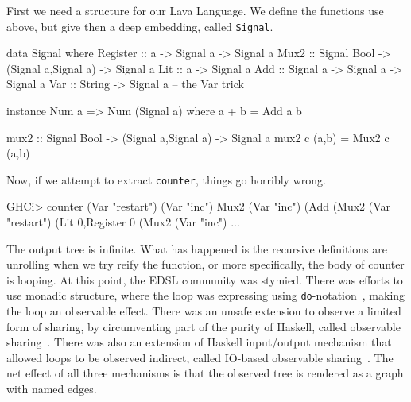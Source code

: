 \documentclass[11pt]{article}
\begin{document}
First we need a structure for our Lava Language. We define the
functions use above, but give then a deep embedding, called \verb|Signal|.
\begin{Code}
        
data Signal where
  Register :: a -> Signal a                      -> Signal a
  Mux2     :: Signal Bool -> (Signal a,Signal a) -> Signal a
  Lit      :: a                                  -> Signal a
  Add      :: Signal a -> Signal a               -> Signal a
  Var      :: String                             -> Signal  a -- the Var trick

instance Num a => Num (Signal a) where
  a + b = Add a b

mux2 :: Signal Bool -> (Signal a,Signal a) -> Signal a
mux2 c (a,b) = Mux2 c (a,b)

\end{Code}
Now, if we attempt to extract \verb|counter|, things go horribly wrong.
\begin{Code}
GHCi> counter (Var "restart") (Var "inc")
Mux2 (Var "inc") (Add (Mux2 (Var "restart") (Lit 0,Register 0 (Mux2 (Var "inc") ...
\end{Code}        
The output tree is infinite.
What has happened is the recursive definitions are unrolling when we try reify the function,
or more specifically, the body of counter is looping. At this point, the EDSL community was
stymied. There was efforts to use monadic structure, where the loop was expressing using
\verb|do|-notation~\cite{Erkok:2000:Recursive-Monad},
making the loop an observable effect. There was an unsafe
extension to observe a limited form of sharing, by circumventing part of the purity of Haskell,
called observable sharing~\cite{Claessen:99:ObserveSharing}.
There was also an extension of Haskell input/output mechanism that allowed loops to
be observed indirect, called IO-based observable sharing~\cite{Gill:09:TypeSafeReification}. 
The net effect of all three
mechanisms is that the observed tree is rendered as a graph with named edges.
\end{document}
